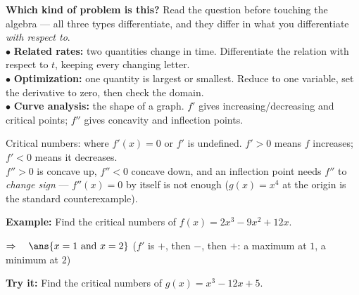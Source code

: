 \documentclass[12pt]{article}
\begin{document}

\begin{formulabox}
\textbf{Which kind of problem is this?} Read the question before touching the
algebra --- all three types differentiate, and they differ in what you
differentiate \emph{with respect to}.\\[3pt]
$\bullet$ \textbf{Related rates:} two quantities change in time. Differentiate
the relation with respect to $t$, keeping every changing letter.\\[2pt]
$\bullet$ \textbf{Optimization:} one quantity is largest or smallest. Reduce to
one variable, set the derivative to zero, then check the domain.\\[2pt]
$\bullet$ \textbf{Curve analysis:} the shape of a graph. $f'$ gives
increasing/decreasing and critical points; $f''$ gives concavity and inflection
points.
\end{formulabox}


\begin{formulabox}
Critical numbers: where $f'(x) = 0$ or $f'$ is undefined. $f' > 0$ means $f$
increases; $f' < 0$ means it decreases.\\[3pt]
$f'' > 0$ is concave up, $f'' < 0$ concave down, and an inflection point needs
$f''$ to \emph{change sign} --- $f''(x) = 0$ by itself is not enough
($g(x) = x^4$ at the origin is the standard counterexample).
\end{formulabox}

\begin{examplebox}
\textbf{Example:} \quad Find the critical numbers of $f(x) = 2x^3 - 9x^2 + 12x$.

$\Rightarrow\quad \ans{x = 1 \text{ and } x = 2}$ \quad ($f'$ is $+$, then $-$,
then $+$: a maximum at $1$, a minimum at $2$)
\end{examplebox}

\begin{tryitbox}
\textbf{Try it:} \quad Find the critical numbers of $g(x) = x^3 - 12x + 5$.\\[2pt]
\end{tryitbox}
\end{document}
